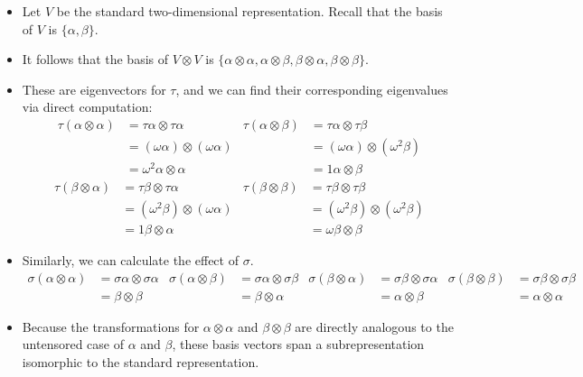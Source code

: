 \documentclass[../notes.tex]{subfiles}
\begin{document}
\begin{itemize}
    \begin{itemize}
        \item Let $V$ be the standard two-dimensional representation. Recall that the basis of $V$ is $\{\alpha,\beta\}$.
        \item It follows that the basis of $V\otimes V$ is $\{\alpha\otimes\alpha,\alpha\otimes\beta,\beta\otimes\alpha,\beta\otimes\beta\}$.
        \item These are eigenvectors for $\tau$, and we can find their corresponding eigenvalues via direct computation:
        \begin{align*}
            \tau(\alpha\otimes\alpha) &= \tau\alpha\otimes\tau\alpha&
                \tau(\alpha\otimes\beta) &= \tau\alpha\otimes\tau\beta\\
            &= (\omega\alpha)\otimes(\omega\alpha)&
                &= (\omega\alpha)\otimes(\omega^2\beta)\\
            &= \omega^2\alpha\otimes\alpha&
                &= 1\alpha\otimes\beta
        \end{align*}
        \begin{align*}
            \tau(\beta\otimes\alpha) &= \tau\beta\otimes\tau\alpha&
                \tau(\beta\otimes\beta) &= \tau\beta\otimes\tau\beta\\
            &= (\omega^2\beta)\otimes(\omega\alpha)&
                &= (\omega^2\beta)\otimes(\omega^2\beta)\\
            &= 1\beta\otimes\alpha&
                &= \omega\beta\otimes\beta
        \end{align*}
        \item Similarly, we can calculate the effect of $\sigma$.
        \begin{align*}
            \sigma(\alpha\otimes\alpha) &= \sigma\alpha\otimes\sigma\alpha&
                \sigma(\alpha\otimes\beta) &= \sigma\alpha\otimes\sigma\beta&
                    \sigma(\beta\otimes\alpha) &= \sigma\beta\otimes\sigma\alpha&
                        \sigma(\beta\otimes\beta) &= \sigma\beta\otimes\sigma\beta\\
            &= \beta\otimes\beta&
                &= \beta\otimes\alpha&
                    &= \alpha\otimes\beta&
                        &= \alpha\otimes\alpha
        \end{align*}
        \item Because the transformations for $\alpha\otimes\alpha$ and $\beta\otimes\beta$ are directly analogous to the untensored case of $\alpha$ and $\beta$, these basis vectors span a subrepresentation isomorphic to the standard representation.

\end{itemize}
\end{itemize}
\end{document}
